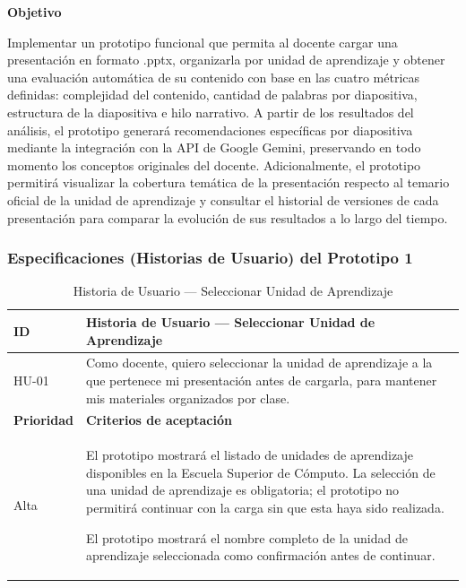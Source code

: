 \documentclass[11pt]{article}
\begin{document}
\textbf{Objetivo}

Implementar un prototipo funcional que permita al docente cargar una presentación en formato .pptx, organizarla por unidad de aprendizaje y obtener una evaluación automática de su contenido con base en las cuatro métricas definidas: complejidad del contenido, cantidad de palabras por diapositiva, estructura de la diapositiva e hilo narrativo. A partir de los resultados del análisis, el prototipo generará recomendaciones específicas por diapositiva mediante la integración con la API de Google Gemini, preservando en todo momento los conceptos originales del docente. Adicionalmente, el prototipo permitirá visualizar la cobertura temática de la presentación respecto al temario oficial de la unidad de aprendizaje y consultar el historial de versiones de cada presentación para comparar la evolución de sus resultados a lo largo del tiempo.

\subsubsection*{Especificaciones (Historias de Usuario) del Prototipo 1}

\begin{table}[H]
    \centering
    \renewcommand{\arraystretch}{1.2}
    \begin{tabular}{|p{2.5cm}|p{11cm}|}
        \hline
        \textbf{ID} & \textbf{Historia de Usuario --- Seleccionar Unidad de Aprendizaje} \\
        \hline
        HU-01 & Como docente, quiero seleccionar la unidad de aprendizaje a la que pertenece mi presentación antes de cargarla, para mantener mis materiales organizados por clase. \\
        \hline
        \textbf{Prioridad} & \textbf{Criterios de aceptación} \\
        \hline
        Alta & El prototipo mostrará el listado de unidades de aprendizaje disponibles en la Escuela Superior de Cómputo. La selección de una unidad de aprendizaje es obligatoria; el prototipo no permitirá continuar con la carga sin que esta haya sido realizada. 
        
        El prototipo mostrará el nombre completo de la unidad de aprendizaje seleccionada como confirmación antes de continuar. \\
        \hline
    \end{tabular}
    \caption{Historia de Usuario — Seleccionar Unidad de Aprendizaje}
    \label{tab:hu-seleccionar-unidad}
\end{table}
\end{document}
